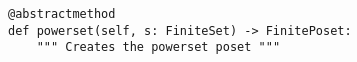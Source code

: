 \begin{verbatim}
@abstractmethod
def powerset(self, s: FiniteSet) -> FinitePoset:
    """ Creates the powerset poset """
\end{verbatim}